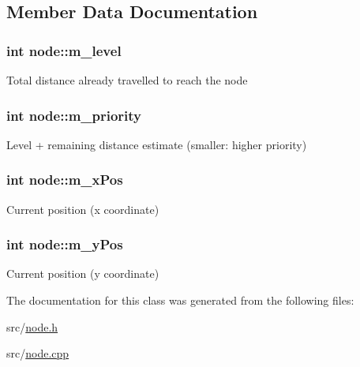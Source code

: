 \subsection{Member Data Documentation}
\hypertarget{classnode_ab68076929ea68209db1fdd25b7530515}{
\subsubsection[{m\_\-level}]{\setlength{\rightskip}{0pt plus 5cm}int {\bf node::m\_\-level}}}
\label{classnode_ab68076929ea68209db1fdd25b7530515}
Total distance already travelled to reach the node \hypertarget{classnode_ae1c537b9584f180d868a0ddf1b64526c}{
\subsubsection[{m\_\-priority}]{\setlength{\rightskip}{0pt plus 5cm}int {\bf node::m\_\-priority}}}
\label{classnode_ae1c537b9584f180d868a0ddf1b64526c}
Level + remaining distance estimate (smaller: higher priority) \hypertarget{classnode_a377c0cd9462931487ee9a80917c0071a}{
\subsubsection[{m\_\-xPos}]{\setlength{\rightskip}{0pt plus 5cm}int {\bf node::m\_\-xPos}}}
\label{classnode_a377c0cd9462931487ee9a80917c0071a}
Current position (x coordinate) \hypertarget{classnode_a848f211f150104a88c1e072c4716f169}{
\subsubsection[{m\_\-yPos}]{\setlength{\rightskip}{0pt plus 5cm}int {\bf node::m\_\-yPos}}}
\label{classnode_a848f211f150104a88c1e072c4716f169}
Current position (y coordinate) 

The documentation for this class was generated from the following files:\begin{DoxyCompactItemize}
\item 
src/\hyperlink{node_8h}{node.h}\item 
src/\hyperlink{node_8cpp}{node.cpp}\end{DoxyCompactItemize}
